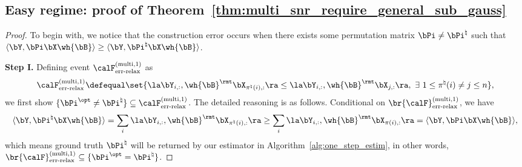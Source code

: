 \documentclass[11pt]{article}
\def \bPitrue {\bPi^{\natural}}
\def \bPiopt {\bPi^{\opt}}
\begin{document}
\subsection{Easy regime: proof of Theorem~\ref{thm:multi_snr_require_general_sub_gauss}}
\begin{proof}
To begin with, we notice that the construction error occurs when there exists some permutation matrix $\bPi \neq \bPitrue$ such that $\langle \bY, \bPi \bX \wh{\bB}  \rangle  \geq \langle \bY, \bPitrue \bX \wh{\bB}\rangle$.

\vspace{0.1in}\noindent
\textbf{Step I.}
Defining event $\calF_{\textup{err-relax}}^{(\textup{multi}, 1)}$ as
\[
\calF_{\textup{err-relax}}^{(\textup{multi}, 1)} \defequal
\set{ \la \bY_{i, :},  \wh{\bB}^{\rmt}\bX_{\pi^{\natural}(i), :} \ra
\leq \la \bY_{i, :}, \wh{\bB}^{\rmt} \bX_{j, :} \ra,~\exists~1\leq \pi^{\natural}(i) \neq  j \leq n},
\]
we first show $\{\bPiopt \neq \bPitrue\}\subseteq \calF_{\textup{err-relax}}^{(\textup{multi}, 1)}$.
The detailed reasoning is as follows.
Conditional on $\br{\calF}_{\textup{err-relax}}^{(\textup{multi}, 1)}$, we have
\[
\langle \bY, \bPitrue \bX \wh{\bB}\rangle =
\sum_i \la \bY_{i, :},  \wh{\bB}^{\rmt}\bX_{\pi^{\natural}(i), :} \ra
\geq \sum_{i} \la \bY_{i, :}, \wh{\bB}^{\rmt} \bX_{\pi(i), :} \ra
= \langle \bY, \bPi \bX \wh{\bB}\rangle,
\]
which means ground truth $\bPitrue$ will be returned by our estimator in
Algorithm~\ref{alg:one_step_estim}, in other words,
$\br{\calF}_{\textup{err-relax}}^{(\textup{multi}, 1)} \subseteq \{\bPiopt = \bPitrue\}$.


\end{proof}
\end{document}
